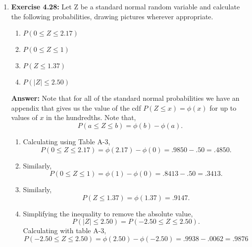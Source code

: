 \documentclass[12pt]{article}
\theoremstyle{homework}
\begin{document}
\begin{enumerate}



\item\hspace{.5in}\textbf{Exercise 4.28:} Let Z be a standard normal random variable and calculate the following probabilities, drawing pictures wherever appropriate.
\begin{enumerate}
\item $P(0\le Z\le2.17)$
\item $P(0\le Z\le1)$
\addtocounter{enumii}{2}
\item $P(Z\le 1.37)$
\addtocounter{enumii}{4}
\item $P(|Z| \le 2.50)$
\end{enumerate}

\textbf{Answer:} Note that for all of the standard normal probabilities we have an appendix that gives us the value of the
cdf $P(Z\le x) = \phi(x)$ for up to values of $x$ in the hundredths. Note that,
\begin{equation*}
  P(a \le Z \le b) = \phi(b) - \phi(a).
\end{equation*}

\begin{enumerate}
\item Calculating using Table A-3,
\begin{equation*}
  P(0\le Z\le2.17) = \phi(2.17) - \phi(0) = .9850 - .50 = .4850.
\end{equation*}


\item Similarly,
\begin{equation*}
  P(0\le Z\le1) = \phi(1) - \phi(0) = .8413 - .50 = .3413.
\end{equation*}
\addtocounter{enumii}{2}
\item Similarly,
\begin{equation*}
  P(Z\le 1.37) = \phi(1.37) = .9147.
\end{equation*}
\addtocounter{enumii}{4}
\item Simplifying the inequality to remove the absolute value,
\begin{equation*}
  P(|Z| \le 2.50) = P(-2.50 \le Z \le 2.50).
\end{equation*}
Calculating with table A-3,
\begin{equation*}
  P(-2.50 \le Z \le 2.50) = \phi(2.50) - \phi(-2.50) = .9938 - .0062 = .9876
\end{equation*}
\end{enumerate}


\end{enumerate}
\end{document}

